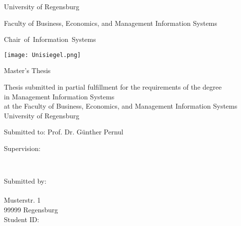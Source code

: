 %
%
%

\thispagestyle{empty}
\begin{titlepage}

\begin{adjustwidth}{-2cm}{}


\renewcommand{\thepage}{}

\begin{center}

\large{University of Regensburg\\}

\large{Faculty of Business, Economics, and Management Information Systems\\}

\large{\mbox{{Chair of Information Systems}}}

\vspace*{5mm}

\Large{\textbf{\titlethema}}

\vspace*{5mm}
\texttt{[image: Unisiegel.png]}
\vspace*{4mm}

\Large{Master's Thesis}

\vspace*{5mm}


\end{center}
\begin{center}
Thesis submitted in partial fulfillment for the requirements of the degree \\
 in Management Information Systems \\
at the Faculty of Business, Economics, and Management Information Systems\\
University of Regensburg

\vspace*{5mm}

\Large{Submitted to: Prof. Dr. Günther Pernul\\}

\Large{Supervision: \supervisor\\} 

\end{center}

\vfill

\begin{center}
\large{\submissiondate\\}
\end{center}
\vspace*{0.6cm}
\begin{flushleft}
Submitted by: \\
\vspace*{7pt}
\authorname\\
Musterstr. 1\\
99999 Regensburg\\
Student ID: \studentID\\





\end{flushleft}
\end{adjustwidth}
\end{titlepage}
